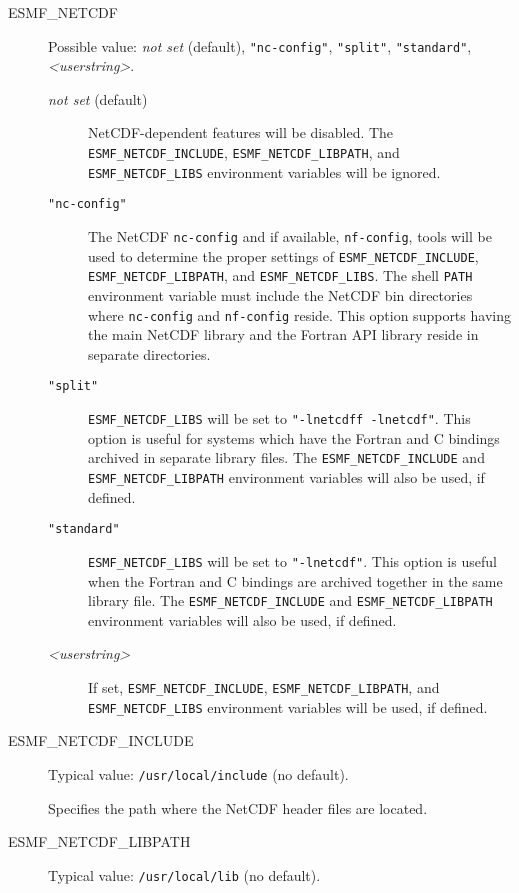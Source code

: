 \begin{description}

\item[ESMF\_NETCDF] Possible value: {\it not set} (default), {\tt "nc-config"}, {\tt "split"},
{\tt "standard"}, {\it <userstring>}.

\begin{description}
\item[{\it not set} (default)] NetCDF-dependent features will be disabled.
The {\tt ESMF\_NETCDF\_INCLUDE}, {\tt ESMF\_NETCDF\_LIBPATH}, and
{\tt ESMF\_NETCDF\_LIBS} environment variables will be ignored.

\item[{\tt "nc-config"}] The NetCDF {\tt nc-config} and if available, {\tt nf-config},
tools will be used to determine the proper settings of {\tt ESMF\_NETCDF\_INCLUDE},
{\tt ESMF\_NETCDF\_LIBPATH}, and {\tt ESMF\_NETCDF\_LIBS}.  The shell {\tt PATH}
environment variable must include the NetCDF bin directories where {\tt nc-config}
and {\tt nf-config} reside.  This option supports having the main NetCDF library and the
Fortran API library reside in separate directories.

\item[{\tt "split"}] {\tt ESMF\_NETCDF\_LIBS} will be set to
{\tt "-lnetcdff -lnetcdf"}.  This option is useful for systems
which have the Fortran and C bindings archived in separate library files.
The {\tt ESMF\_NETCDF\_INCLUDE} and {\tt ESMF\_NETCDF\_LIBPATH}
environment variables will also be used, if defined.

\item[{\tt "standard"}] {\tt ESMF\_NETCDF\_LIBS} will be set to
{\tt "-lnetcdf"}.  This option is useful when the Fortran and
C bindings are archived together in the same library file.  The {\tt ESMF\_NETCDF\_INCLUDE}
and {\tt ESMF\_NETCDF\_LIBPATH} environment variables will also be used,
if defined.

\item[{\it <userstring>}] If set, {\tt ESMF\_NETCDF\_INCLUDE},
{\tt ESMF\_NETCDF\_LIBPATH}, and {\tt ESMF\_NETCDF\_LIBS} environment
variables will be used, if defined.
\end{description}

\item[ESMF\_NETCDF\_INCLUDE] Typical value: {\tt /usr/local/include}
(no default).

Specifies the path where the NetCDF header files are located.

\item[ESMF\_NETCDF\_LIBPATH] Typical value: {\tt /usr/local/lib} (no default).


\end{description}
